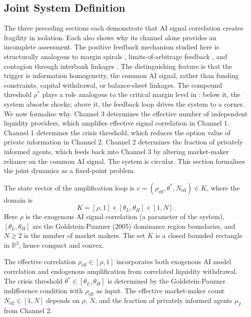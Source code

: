 \label{sec:amplification}

\subsection{Joint System Definition}

The three preceding sections each demonstrate that AI signal correlation creates fragility in isolation. Each also shows why its channel alone provides an incomplete assessment. The positive feedback mechanism studied here is structurally analogous to margin spirals \citep{brunnermeier2009}, limits-of-arbitrage feedback \citep{shleifer1997}, and contagion through interbank linkages \citep{allen2000}. The distinguishing feature is that the trigger is information homogeneity, the common AI signal, rather than funding constraints, capital withdrawal, or balance-sheet linkages. The compound threshold $\rho^*$ plays a role analogous to the critical margin level in \citet{brunnermeier2009}: below it, the system absorbs shocks; above it, the feedback loop drives the system to a corner. We now formalise why. Channel 3 determines the effective number of independent liquidity providers, which amplifies effective signal correlation in Channel 1. Channel 1 determines the crisis threshold, which reduces the option value of private information in Channel 2. Channel 2 determines the fraction of privately informed agents, which feeds back into Channel 3 by altering market-maker reliance on the common AI signal. The system is circular. This section formalises the joint dynamics as a fixed-point problem.

The state vector of the amplification loop is $v = (\rho_{\text{eff}}, \theta^*, N_{\text{eff}}) \in K$, where the domain is
\begin{equation}\label{eq:domain}
  K = [\rho, 1] \times [\theta_L, \theta_H] \times [1, N].
\end{equation}
Here $\rho$ is the exogenous AI signal correlation (a parameter of the system), $[\theta_L, \theta_H]$ are the Goldstein-Pauzner (2005) dominance region boundaries, and $N \geq 2$ is the number of market makers. The set $K$ is a closed bounded rectangle in $\mathbb{R}^3$, hence compact and convex.

The effective correlation $\rho_{\text{eff}} \in [\rho, 1]$ incorporates both exogenous AI model correlation and endogenous amplification from correlated liquidity withdrawal. The crisis threshold $\theta^* \in [\theta_L, \theta_H]$ is determined by the Goldstein-Pauzner indifference condition with $\rho_{\text{eff}}$ as input. The effective market-maker count $N_{\text{eff}} \in [1, N]$ depends on $\rho$, $N$, and the fraction of privately informed agents $\mu_I$ from Channel 2.

